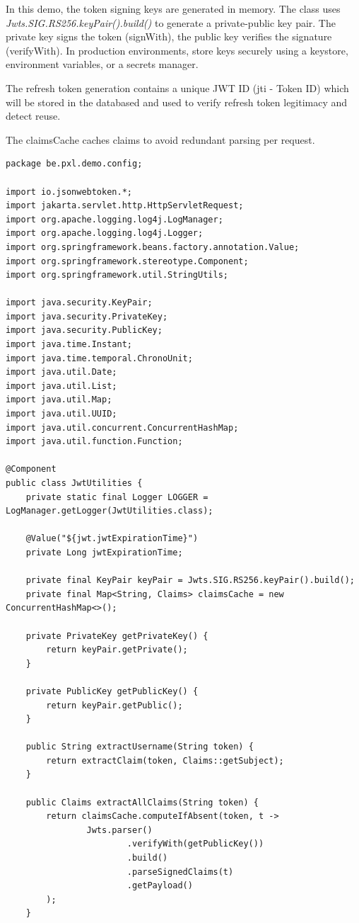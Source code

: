 In this demo, the token signing keys are generated in memory. 
The class uses \textit{Jwts.SIG.RS256.keyPair().build()} to generate a private-public key pair. The private key signs the token (signWith), the public key verifies the signature (verifyWith).  In production environments, store keys securely using a keystore, environment variables, or a secrets manager.

The refresh token generation contains a unique JWT ID (jti - Token ID) which will be stored in the databased and used to verify refresh token legitimacy and detect reuse.

The claimsCache caches claims to avoid redundant parsing per request.

\begin{lstlisting}
package be.pxl.demo.config;

import io.jsonwebtoken.*;
import jakarta.servlet.http.HttpServletRequest;
import org.apache.logging.log4j.LogManager;
import org.apache.logging.log4j.Logger;
import org.springframework.beans.factory.annotation.Value;
import org.springframework.stereotype.Component;
import org.springframework.util.StringUtils;

import java.security.KeyPair;
import java.security.PrivateKey;
import java.security.PublicKey;
import java.time.Instant;
import java.time.temporal.ChronoUnit;
import java.util.Date;
import java.util.List;
import java.util.Map;
import java.util.UUID;
import java.util.concurrent.ConcurrentHashMap;
import java.util.function.Function;

@Component
public class JwtUtilities {
    private static final Logger LOGGER = LogManager.getLogger(JwtUtilities.class);

    @Value("${jwt.jwtExpirationTime}")
    private Long jwtExpirationTime;

    private final KeyPair keyPair = Jwts.SIG.RS256.keyPair().build();
    private final Map<String, Claims> claimsCache = new ConcurrentHashMap<>();

    private PrivateKey getPrivateKey() {
        return keyPair.getPrivate();
    }

    private PublicKey getPublicKey() {
        return keyPair.getPublic();
    }

    public String extractUsername(String token) {
        return extractClaim(token, Claims::getSubject);
    }

    public Claims extractAllClaims(String token) {
        return claimsCache.computeIfAbsent(token, t ->
                Jwts.parser()
                        .verifyWith(getPublicKey())
                        .build()
                        .parseSignedClaims(t)
                        .getPayload()
        );
    }


\end{lstlisting}
